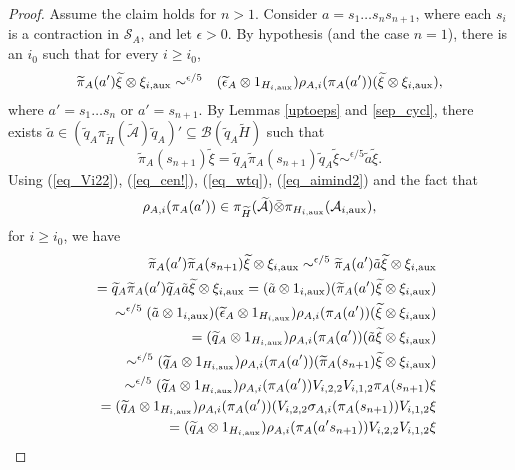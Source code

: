 \documentclass[11pt]{amsart}
\theoremstyle{definition}
\newcommand{\cl}[1]{\mathcal{#1}}
\providecommand{\wt}[1]{\widetilde{#1}}
\begin{document}
\begin{proof}
Assume the claim holds for $n>1$. Consider $a = s_1\ldots s_ns_{n+1}$, where each $s_{i}$ is a contraction in $\cl S_A$, and let $\epsilon>0$. By hypothesis (and the case $n=1$), there is an $i_0$ such that for every $i\geq i_0$,
\begin{eqnarray}\label{eq_aimind2}
\wt{\pi}_A(a')\wt{\xi}\otimes\xi_{i,{\rm aux}}
& \sim^{\epsilon/5} & (\wt{\epsilon}_A\otimes 1_{H_{i,{\rm aux}}})\rho_{A,i}(\pi_A(a'))(\wt{\xi}\otimes
\xi_{i,{\rm aux}}),
\end{eqnarray}
where $a'=s_1\ldots s_n$ or $a'=s_{n+1}$. By Lemmas \ref{uptoeps} and \ref{sep_cycl}, 
 there exists 
 $\tilde a\in(\wt{q}_A\pi_{\wt{H}}(\wt{\cl A})\wt{q}_A)'\subseteq 
 \cl B(\wt{q}_A\wt{H})$ such that  
$$\wt{\pi}_A(s_{n+1})\wt{\xi}=\wt{q}_A\wt{\pi}_A(s_{n+1})\wt{q}_A\wt{\xi}\sim^{\epsilon/5}\tilde a\wt{\xi}.$$
Using (\ref{eq_Vi22}), (\ref{eq_cen!}), (\ref{eq_wtq}), 
(\ref{eq_aimind2}) and 
the fact that 
$$\rho_{A,i}(\pi_A(a'))\in\pi_{\wt{H}}(\wt{\cl A})\bar\otimes\pi_{H_{i,\rm aux}}(\cl A_{i,\rm aux}),$$ 
for $i\geq i_0$, we have
\begin{eqnarray*}
 &&
 \hspace{-0.7cm} \wt{\pi}_A(a')\wt{\pi}_A(s_{n+1})\wt{\xi}\otimes\xi_{i,\rm aux}
 \sim^{\epsilon/5}   
 \wt{\pi}_A(a')\tilde a\wt{\xi}\otimes\xi_{i,\rm aux}\\
 && =
 \wt{q}_A\wt{\pi}_A(a')\wt{q}_A\tilde a\wt{\xi}\otimes\xi_{i,\rm aux}
 =
 (\tilde a\otimes 1_{i,\rm aux})(\wt{\pi}_A(a')\wt{\xi}\otimes\xi_{i,\rm aux})\\
 && \sim^{\epsilon/5}
(\tilde a\otimes 1_{i,\rm aux})(\wt{\epsilon}_A\otimes 1_{H_{i,\rm aux}})\rho_{A,i}(\pi_A(a'))(\wt{\xi}\otimes\xi_{i,\rm aux})\\
 && =
 (\wt{q}_A\otimes 1_{H_{i,{\rm aux}}})\rho_{A,i}(\pi_A(a'))
 (\tilde a\wt{\xi}\otimes\xi_{i,{\rm aux}})\\
 && \sim^{\epsilon/5} 
 (\wt{q}_A\otimes 1_{H_{i,\rm aux}})\rho_{A,i}(\pi_A(a'))(\wt{\pi}_A(s_{n+1})\wt{\xi}\otimes\xi_{i,{\rm aux}})\\
 && \sim^{\epsilon/5}
 (\wt{q}_A\otimes 1_{H_{i,\rm aux}})\rho_{A,i}(\pi_A(a'))V_{i,2,2}V_{i,1,2}\pi_A(s_{n+1})\xi\\
 && =
 (\wt{q}_A\otimes 1_{H_{i,\rm aux}})\rho_{A,i}(\pi_A(a'))(V_{i,2,2}\sigma_{A,i}(\pi_A(s_{n+1}))V_{i,1,2}\xi\\
 && =
 (\wt{q}_A\otimes 1_{H_{i,{\rm aux}}})\rho_{A,i}(\pi_A(a's_{n+1}))V_{i,2,2}V_{i,1,2}\xi\\

\end{eqnarray*}
\end{proof}
\end{document}
